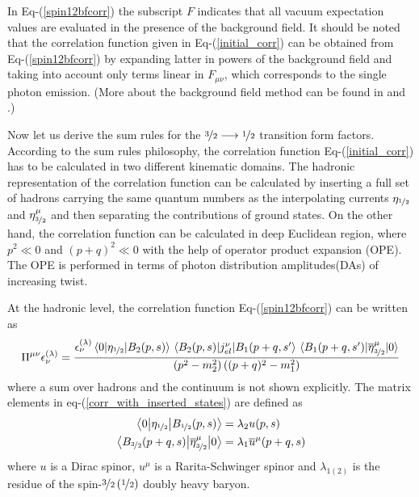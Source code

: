 In Eq-(\ref{spin12bfcorr}) the subscript $F$ indicates that all vacuum expectation values are evaluated in the presence of the background field. 
It should be noted that the correlation function given in Eq-(\ref{initial_corr}) can be obtained from Eq-(\ref{spin12bfcorr}) by expanding latter in powers of the background field and taking into account only terms linear in $F_{\mu\nu}$, which corresponds to the single photon emission. (More about the background field method can be found in \cite{PhotonDA} and \cite{ExternalField}.)

Now let us derive the sum rules for the $\nicefrac{3}{2}\longrightarrow\nicefrac{1}{2}$ transition form factors.  
According to the sum rules philosophy, the correlation function Eq-(\ref{initial_corr}) has to be calculated in two different kinematic domains. 
The hadronic representation of the correlation function can be calculated by inserting a full set of hadrons carrying the same quantum numbers as the interpolating currents $\eta_{\nicefrac{1}{2}}$ and $\eta^\mu_{\nicefrac{3}{2}}$ and 
then separating the contributions of ground states. On the other hand, the correlation function can be calculated in deep Euclidean region, where $p^2\ll0$ and $(p+q)^2\ll0$ with the help of operator product expansion (OPE). 
The OPE is performed in terms of photon distribution amplitudes(DAs) of increasing twist. 

At the hadronic level, the correlation function Eq-(\ref{spin12bfcorr}) can be written as
\begin{equation}
    \Pi^{\mu\nu}\epsilon_\nu^{(\lambda)} = \dfrac{\epsilon_\nu^{(\lambda)}\mel{0}{\eta_{\nicefrac{1}{2}}}{B_2(p,s)}\mel{B_2(p,s)}{j_{el}^\nu}{B_1(p+q,s^\prime}\mel{B_1(p+q,s^\prime)}{\overline{\eta}^\mu_{\nicefrac{3}{2}}}{0}}{\left(p^2-m_2^2\right)\left((p+q)^2-m_1^2\right)}
    \label{corr_with_inserted_states}
\end{equation}
where a sum over hadrons and the continuum is not shown explicitly.
The matrix elements in eq-(\ref{corr_with_inserted_states}) are defined as
\begin{equation}
    \begin{aligned}
        \mel{0}{\eta_{\nicefrac{1}{2}}}{B_{\nicefrac{1}{2}}(p,s)} &= \lambda_2 u(p,s)\\
        \mel{B_{\nicefrac{3}{2}}(p+q,s)}{\overline{\eta}^\mu_{\nicefrac{3}{2}}}{0} &= \lambda_1 \overline{u}^\mu(p+q,s)
    \end{aligned}
    \label{mels}
\end{equation}
where $u$ is a Dirac spinor, $u^\mu$ is a Rarita-Schwinger spinor and $\lambda_{1\left(2\right)}$ is the residue of the spin-$\nicefrac{3}{2}\left(\nicefrac{1}{2}\right)$ doubly heavy baryon.

